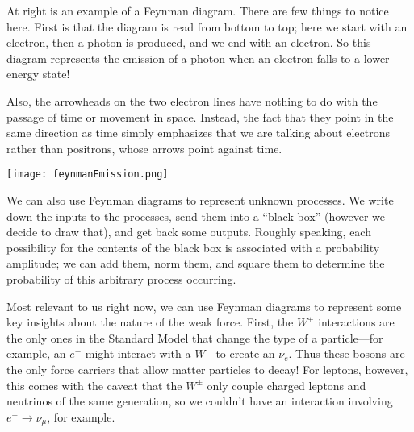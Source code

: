 \documentclass[../p052main.tex]{subfiles}
\begin{document}
\parbox{0.66\textwidth}{
    \vspace{6pt}
    At right is an example of a Feynman diagram.
    There are few things to notice here.
    First is that the diagram is read from bottom to top; here we start with an electron, then a photon is produced, and we end with an electron.
    So this diagram represents the emission of a photon when an electron falls to a lower energy state!

    \vspace{6pt}
    Also, the arrowheads on the two electron lines have nothing to do with the passage of time or movement in space.
    Instead, the fact that they point in the same direction as time simply emphasizes that we are talking about electrons rather than positrons, whose arrows point against time.    
}\parbox{0.34\textwidth}{
    \quad\;
    \texttt{[image: feynmanEmission.png]}
}

We can also use Feynman diagrams to represent unknown processes.
We write down the inputs to the processes, send them into a ``black box'' (however we decide to draw that), and get back some outputs.
Roughly speaking, each possibility for the contents of the black box is associated with a probability amplitude; we can add them, norm them, and square them to determine the probability of this arbitrary process occurring.

Most relevant to us right now, we can use Feynman diagrams to represent some key insights about the nature of the weak force.
First, the $W^\pm$ interactions are the only ones in the Standard Model that change the type of a particle---for example, an $e^-$ might interact with a $W^-$ to create an $\nu_e$.
Thus these bosons are the only force carriers that allow matter particles to decay!
For leptons, however, this comes with the caveat that the $W^\pm$ only couple charged leptons and neutrinos of the same generation, so we couldn't have an interaction involving $e^- \to \nu_\mu$, for example.
\end{document}
